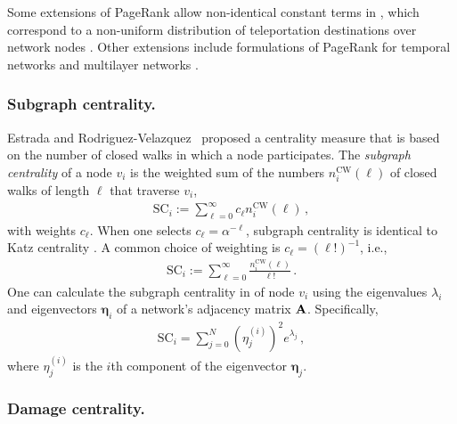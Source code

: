 \documentclass{comnet-mod}
\begin{document}
Some extensions of PageRank allow non-identical constant terms in , which correspond to a non-uniform distribution of teleportation destinations over network nodes \cite{Gleich2015}. Other extensions include formulations of PageRank for temporal networks and multilayer networks \cite{Taylor2021}.


\subsubsection{Subgraph centrality.}

Estrada and Rodriguez-Velazquez~\cite{Estrada2005} proposed a centrality measure that is based on the number of closed walks in which a node participates. The \emph{subgraph centrality} of a node $v_i$ is the weighted sum of the numbers $n^{\textrm{CW}}_i(\ell)$ of closed walks of length $\ell$ that traverse $v_i$,
\begin{align}
    \textrm{SC}_i:=\sum_{\ell=0}^\infty c_\ell n^{\textrm{CW}}_i(\ell)\,,\nonumber
\end{align}
with weights $c_\ell$. When one selects $c_\ell=\alpha^{-\ell}$, subgraph centrality is identical to Katz centrality \cite{estrada2012review}. A common choice of weighting is $c_\ell=(\ell!)^{-1}$, i.e., 
\begin{align}
    \textrm{SC}_i:=\sum_{\ell=0}^\infty\frac{n^{\textrm{CW}}_i(\ell)}{\ell!}\,.\label{eq:subgraph-centrality}
\end{align}
One can calculate the subgraph centrality in  of node $v_i$ using the eigenvalues $\lambda_i$ and eigenvectors ${\boldsymbol\eta}_i$ of a network's adjacency matrix ${\bf A}$. Specifically, 
\begin{align}
	\textrm{SC}_i=\sum_{j=0}^N\left(\eta_j^{(i)}\right)^2e^{\lambda_j}\,,\nonumber
\end{align}
where $\eta_j^{(i)}$ is the $i$th component of the eigenvector $\boldsymbol\eta_j$.



\subsubsection{Damage centrality.} 
\end{document}
